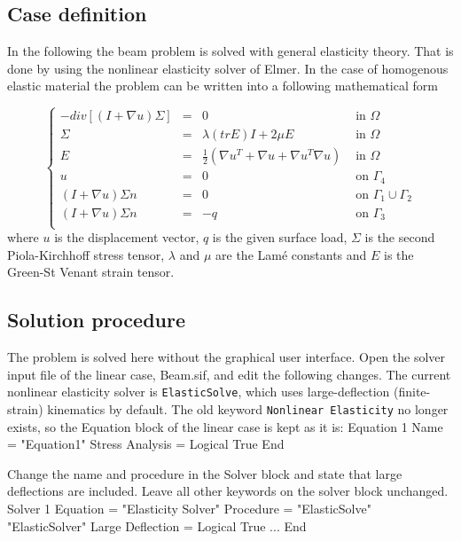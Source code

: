 
\subsection*{Case definition}

In the following the beam problem is solved with general elasticity theory.
That is done by using the nonlinear elasticity solver of Elmer. 
In the case of homogenous 
elastic material the problem can be written into a following mathematical form

\begin{equation}
\left \{
\begin{array}{rcll}
-div [(I+ \nabla u) \Sigma] & = & 0 & \mbox{ in } \Omega \nonumber \\
\Sigma & = & \lambda (tr E)I + 2 \mu E & \mbox{ in } \Omega \nonumber \\
E & = & \frac{1}{2}(\nabla u^{T} + \nabla u + \nabla u^{T} \nabla u) & 
\mbox{ in } \Omega \nonumber \\
u & = & 0 & \mbox{ on } \Gamma_4 \\
(I+ \nabla u)\Sigma n & = & 0 & \mbox{ on } \Gamma_1 \cup \Gamma_2 \\
(I+ \nabla u)\Sigma n & = & -q & \mbox{ on } \Gamma_3 \\
\end{array}
\right .
\end{equation}
where $u$ is the displacement vector, $q$ is the given surface load, $\Sigma$ 
is the second Piola-Kirchhoff stress tensor, $\lambda$ and $\mu$ are the 
Lam\'{e} constants and $E$ is the Green-St Venant strain tensor.


\subsection*{Solution procedure}

The problem is solved here without the graphical user interface.
Open the solver input file of the linear case, Beam.sif, and edit the
following changes. The current nonlinear elasticity solver is
\texttt{ElasticSolve}, which uses large-deflection (finite-strain)
kinematics by default. The old keyword {\tt Nonlinear Elasticity} no longer
exists, so the Equation block of the linear case is kept as it is:
\ttbegin
Equation 1
  Name = "Equation1"
  Stress Analysis = Logical True
End
\ttend

Change the name and procedure in the Solver block and state that large
deflections are included. Leave all other keywords on the solver block
unchanged.
\ttbegin
Solver 1
  Equation = "Elasticity Solver"
  Procedure = "ElasticSolve" "ElasticSolver"
  Large Deflection = Logical True
...
End
\ttend

